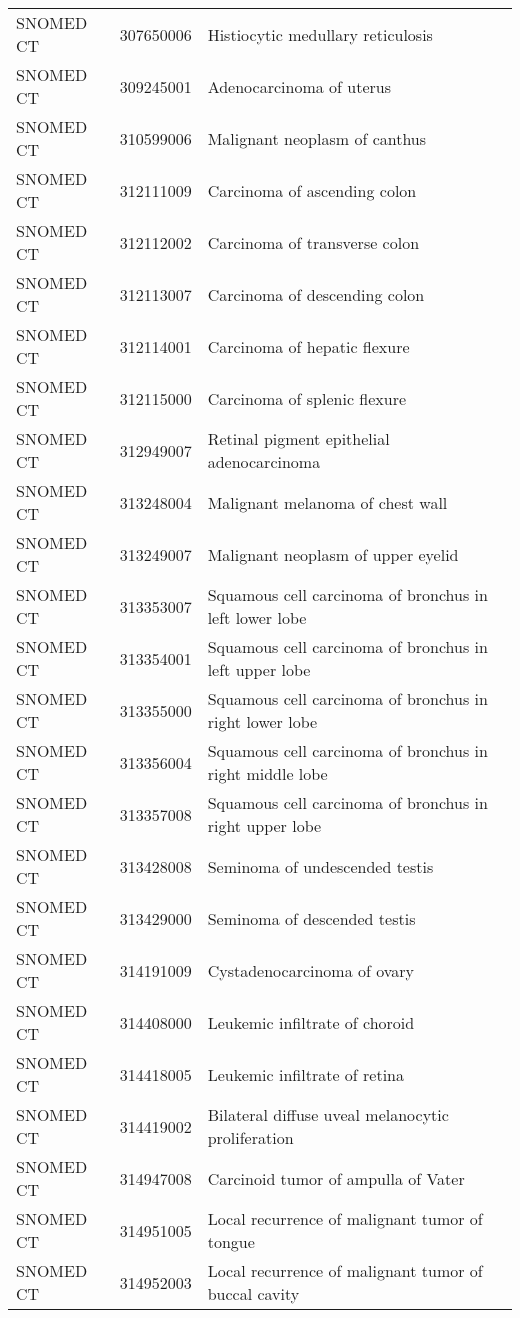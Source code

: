 \begin{longtable}{p{}p{}p{}}
  SNOMED CT & 307650006 & Histiocytic medullary reticulosis \\ 
  SNOMED CT & 309245001 & Adenocarcinoma of uterus \\ 
  SNOMED CT & 310599006 & Malignant neoplasm of canthus \\ 
  SNOMED CT & 312111009 & Carcinoma of ascending colon \\ 
  SNOMED CT & 312112002 & Carcinoma of transverse colon \\ 
  SNOMED CT & 312113007 & Carcinoma of descending colon \\ 
  SNOMED CT & 312114001 & Carcinoma of hepatic flexure \\ 
  SNOMED CT & 312115000 & Carcinoma of splenic flexure \\ 
  SNOMED CT & 312949007 & Retinal pigment epithelial adenocarcinoma \\ 
  SNOMED CT & 313248004 & Malignant melanoma of chest wall \\ 
  SNOMED CT & 313249007 & Malignant neoplasm of upper eyelid \\ 
  SNOMED CT & 313353007 & Squamous cell carcinoma of bronchus in left lower lobe \\ 
  SNOMED CT & 313354001 & Squamous cell carcinoma of bronchus in left upper lobe \\ 
  SNOMED CT & 313355000 & Squamous cell carcinoma of bronchus in right lower lobe \\ 
  SNOMED CT & 313356004 & Squamous cell carcinoma of bronchus in right middle lobe \\ 
  SNOMED CT & 313357008 & Squamous cell carcinoma of bronchus in right upper lobe \\ 
  SNOMED CT & 313428008 & Seminoma of undescended testis \\ 
  SNOMED CT & 313429000 & Seminoma of descended testis \\ 
  SNOMED CT & 314191009 & Cystadenocarcinoma of ovary \\ 
  SNOMED CT & 314408000 & Leukemic infiltrate of choroid \\ 
  SNOMED CT & 314418005 & Leukemic infiltrate of retina \\ 
  SNOMED CT & 314419002 & Bilateral diffuse uveal melanocytic proliferation \\ 
  SNOMED CT & 314947008 & Carcinoid tumor of ampulla of Vater \\ 
  SNOMED CT & 314951005 & Local recurrence of malignant tumor of tongue \\ 
  SNOMED CT & 314952003 & Local recurrence of malignant tumor of buccal cavity \\ 

\end{longtable}

